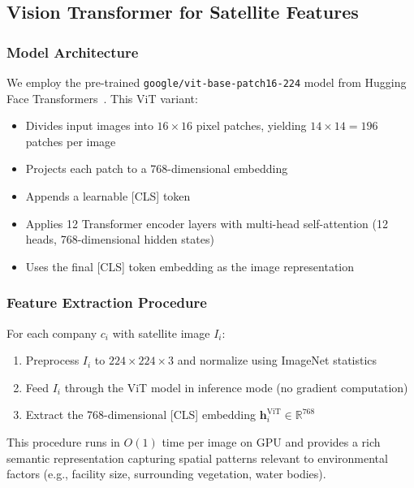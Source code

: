 \subsection{Vision Transformer for Satellite Features}

\subsubsection{Model Architecture}

We employ the pre-trained \texttt{google/vit-base-patch16-224} model from Hugging Face Transformers~\cite{wolf2019transformers}. This ViT variant:
\begin{itemize}
\item Divides input images into $16 \times 16$ pixel patches, yielding $14 \times 14 = 196$ patches per image
\item Projects each patch to a 768-dimensional embedding
\item Appends a learnable [CLS] token
\item Applies 12 Transformer encoder layers with multi-head self-attention (12 heads, 768-dimensional hidden states)
\item Uses the final [CLS] token embedding as the image representation
\end{itemize}

\subsubsection{Feature Extraction Procedure}

For each company $c_i$ with satellite image $I_i$:
\begin{enumerate}
\item Preprocess $I_i$ to $224 \times 224 \times 3$ and normalize using ImageNet statistics
\item Feed $I_i$ through the ViT model in inference mode (no gradient computation)
\item Extract the 768-dimensional [CLS] embedding $\mathbf{h}_i^{\text{ViT}} \in \mathbb{R}^{768}$
\end{enumerate}

This procedure runs in $O(1)$ time per image on GPU and provides a rich semantic representation capturing spatial patterns relevant to environmental factors (e.g., facility size, surrounding vegetation, water bodies).

